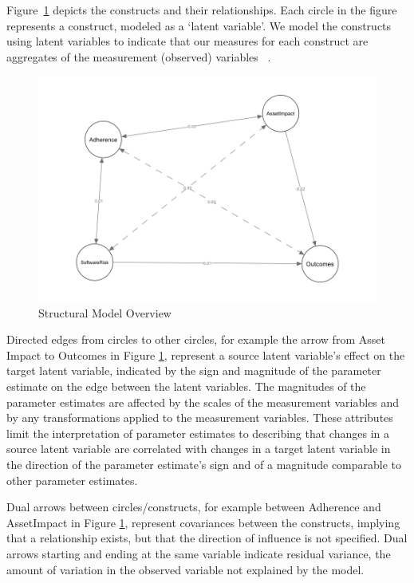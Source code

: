 Figure~\ref{fig:model_constructs} depicts the constructs and their relationships.  Each circle in the figure represents a construct, modeled as a `latent variable'. We model the constructs using latent variables to indicate that our measures for each construct are aggregates of the measurement (observed) variables ~\cite{kline2015principles,borsboom2008latent}. 

 \begin{figure}
 	\includegraphics[width=\columnwidth]{modelzeroB.png}
 	\caption{Structural Model Overview}
 	\label{fig:model_constructs}
 \end{figure}
 
Directed edges from circles to other circles, for example the arrow from Asset Impact to Outcomes in Figure \ref{fig:model_constructs}, represent a source latent variable's effect on the target latent variable, indicated by the sign and magnitude of the parameter estimate on the edge between the latent variables. The magnitudes of the parameter estimates are affected by the scales of the measurement variables and by any transformations applied to the measurement variables. These attributes limit the interpretation of parameter estimates to describing that changes in a source latent variable are correlated with changes in a target latent variable in the direction of the parameter estimate's sign and of a magnitude comparable to other parameter estimates. 

Dual arrows between circles/constructs, for example between Adherence and AssetImpact in Figure \ref{fig:model_constructs}, represent covariances between the constructs, implying that a relationship exists, but that the direction of influence is not specified. Dual arrows starting and ending at the same variable indicate residual variance, the amount of variation in the observed variable not explained by the model.


